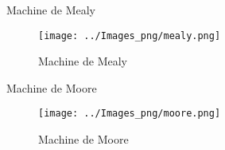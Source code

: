 \documentclass[presentation]{beamer}
\begin{document}
\begin{frame}[label={sec:orgf4b8ddc}]{Machine de Mealy}
\begin{figure}[htbp]
\centering
\texttt{[image: ../Images\_png/mealy.png]}
\caption{\label{fig:org649efd6}Machine de Mealy}
\end{figure}
\end{frame}

\begin{frame}[label={sec:org77818ff}]{Machine de Moore}
\begin{figure}[htbp]
\centering
\texttt{[image: ../Images\_png/moore.png]}
\caption{\label{fig:org16205da}Machine de Moore}
\end{figure}
\end{frame}
\end{document}
